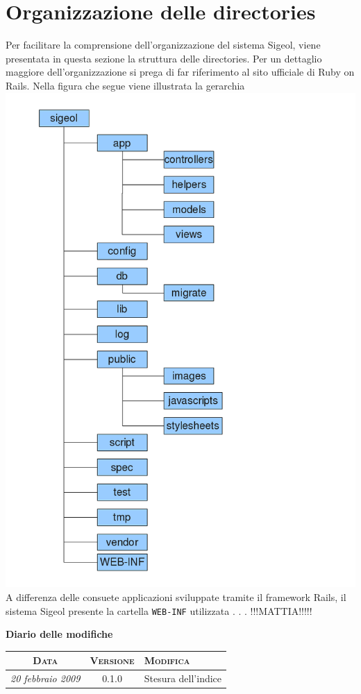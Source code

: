 \documentclass[11pt,a4paper]{article}
\newcommand{\modifiche} 
{
\newpage
\begin{center}
\textbf{Diario delle modifiche} \\
\bigskip
\begin{tabular}{|c|c|p{0.51\textwidth}|}
\hline
\textsc{Data} & \textsc{Versione} & \textsc{Modifica} \\
\hline
\hline
\textit{20 febbraio 2009} & 0.1.0 & Stesura dell'indice \\
\hline
\end{tabular}
\end{center}
}
\begin{document}
\section{Organizzazione delle directories}
Per facilitare la comprensione dell'organizzazione del sistema Sigeol, viene presentata in questa sezione la struttura delle directories. Per un dettaglio maggiore dell'organizzazione si prega di far riferimento al sito ufficiale di Ruby on Rails. Nella figura che segue viene illustrata la gerarchia \\
\includegraphics[scale=0.59]{images/gerarchiacartelle.png}
A differenza delle consuete applicazioni sviluppate tramite il framework Rails, il sistema Sigeol presente la cartella \verb|WEB-INF| utilizzata . . . !!!MATTIA!!!!!
\modifiche
\end{document}
